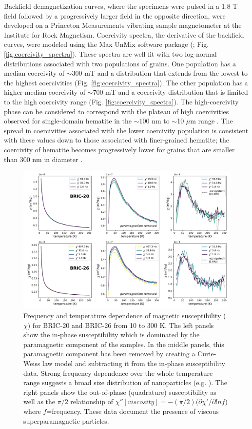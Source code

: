\documentclass[draft]{agujournal2019}
\begin{document}
Backfield demagnetization curves, where the specimens were pulsed in a 1.8 T field followed by a progressively larger field in the opposite direction, were developed on a Princeton Measurements vibrating sample magnetometer at the Institute for Rock Magnetism. Coercivity spectra, the derivative of the backfield curves, were modeled using the Max UnMix software package (\cite{Maxbauer2016a}; Fig. \ref{fig:coercivity_spectra}). These spectra are well fit with two log-normal distributions associated with two populations of grains. One population has a median coercivity of $\sim$300 mT and a distribution that extends from the lowest to the highest coercivities (Fig. \ref{fig:coercivity_spectra}). The other population has a higher median coercivity of $\sim$700 mT and a coercivity distribution that is limited to the high coercivity range (Fig. \ref{fig:coercivity_spectra}). The high-coercivity phase can be considered to correspond with the plateau of high coercivities observed for single-domain hematite in the $\sim$100 nm to $\sim$10 $\mu$m range \cite{Ozdemir2014a}. The spread in coercivities associated with the lower coercivity population is consistent with these values down to those associated with finer-grained hematite; the coercivity of hematite becomes progressively lower for grains that are smaller than 300 nm in diameter \cite{Ozdemir2014a}.

\begin{figure}[!ht]
\noindent\includegraphics[width=\textwidth]{Fig5_low_temp_ac.pdf}
\caption{\small{Frequency and temperature dependence of magnetic susceptibility ($\chi$) for BRIC-20 and BRIC-26 from 10 to 300 K. The left panels show the in-phase susceptibility which is dominated by the paramagnetic component of the samples. In the middle panels, this paramagnetic component has been removed by creating a Curie-Weiss law model and subtracting it from the in-phase susceptibility data. Strong frequency dependence over the whole temperature range suggests a broad size distribution of nanoparticles (e.g. \cite{Jackson2012a}). The right panels show the out-of-phase (quadrature) susceptibility as well as the $\pi/2$ relationship of $\chi''[viscosity] = -(\pi/2)(\partial \chi'/\partial lnf$) where $f$=frequency. These data document the presence of viscous superparamagnetic particles.}}
\label{fig:low_temp_ac}
\end{figure}
\end{document}
